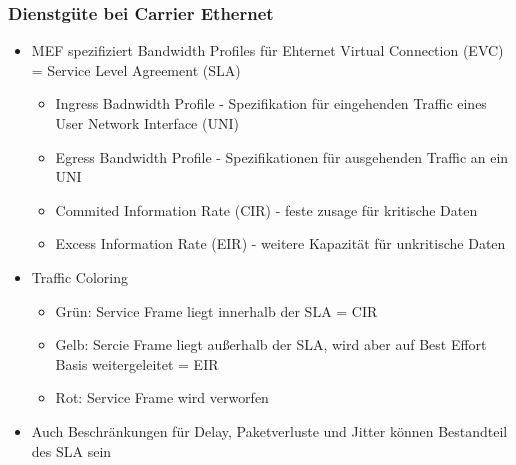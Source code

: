 \subsubsection{Dienstgüte bei Carrier Ethernet}
\begin{itemize}
	\item MEF spezifiziert Bandwidth Profiles für Ehternet Virtual Connection (EVC) = Service Level Agreement (SLA)
	\begin{itemize}
		\item Ingress Badnwidth Profile - Spezifikation für eingehenden Traffic eines User Network Interface (UNI)
		\item Egress Bandwidth Profile - Spezifikationen für ausgehenden Traffic an ein UNI
		\item Commited Information Rate (CIR) - feste zusage für kritische Daten
		\item Excess Information Rate (EIR) - weitere Kapazität für unkritische Daten
	\end{itemize}
	\item Traffic Coloring
	\begin{itemize}
		\item Grün: Service Frame liegt innerhalb der SLA = CIR
		\item Gelb: Sercie Frame liegt außerhalb der SLA, wird aber auf Best Effort Basis weitergeleitet = EIR
		\item Rot: Service Frame wird verworfen
	\end{itemize}
	\item Auch Beschränkungen für Delay, Paketverluste und Jitter können Bestandteil des SLA sein
\end{itemize}
